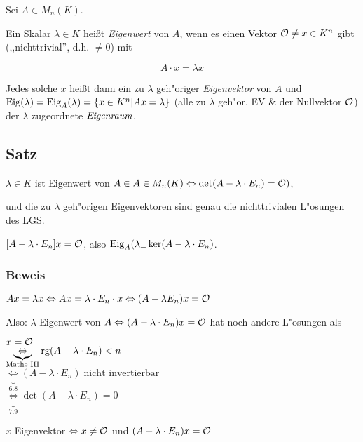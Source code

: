 Sei $A \in M_n(K)$.

Ein Skalar $\lambda \in K$ heißt \emph{Eigenwert} von $A$, wenn es einen Vektor $\mathcal{O} \neq x \in K^n$ gibt (,,nichttrivial'', d.h. $\neq 0$) mit

\[A\cdot x = \lambda x\]

Jedes solche $x$ heißt dann ein zu $\lambda$ geh"origer \emph{Eigenvektor} von $A$ und $\mathrm{ Eig }(\lambda)=\mathrm{ Eig }_A(\lambda)=\{x \in K^n | Ax=\lambda\}$ (alle zu $\lambda$ geh"or. EV \& der Nullvektor $\mathcal{O}$) der $\lambda$ zugeordnete $\emph{Eigenraum}$.

\subsection{Satz}

$\lambda \in K$ ist Eigenwert von $A \in A \in M_n(K) \Leftrightarrow \det(A-\lambda \cdot E_n) = \mathcal{O})$,

und die zu $\lambda$ geh"origen Eigenvektoren sind genau die nichttrivialen L"osungen des LGS.

$[A - \lambda \cdot E_n] x = \mathcal{O}$, also $\mathrm{ Eig }_A(\lambda_ = \ker(A- \lambda \cdot E_n)$.

\subsubsection*{Beweis}

$Ax = \lambda x \Leftrightarrow Ax = \lambda \cdot E_n \cdot x \Leftrightarrow (A - \lambda E_n) x = \mathcal{O}$

Also: $\lambda$ Eigenwert von $A \Leftrightarrow (A- \lambda \cdot E_n)x = \mathcal{O}$ hat noch andere L"osungen als 

$x = \mathcal{O}$\\
$\underbrace{\Leftrightarrow}_{\text{Mathe III}} \mathrm{ rg }(A-\lambda \cdot E_n) < n$\\
$\underbrace{\Leftrightarrow}_{6.8}(A-\lambda \cdot E_n) \; \text{nicht invertierbar}$\\
$\underbrace{\Leftrightarrow}_{7.9}\det(A-\lambda \cdot E_n) = 0$

$x$ Eigenvektor $\Leftrightarrow x \neq \mathcal{O}$ und $(A- \lambda \cdot E_n) x = \mathcal{O}$


